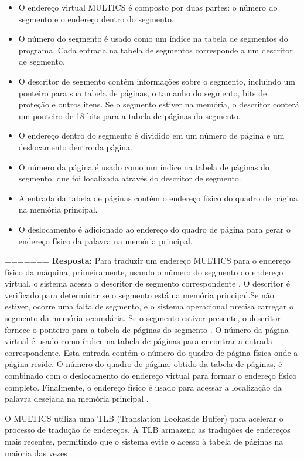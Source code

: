 \documentclass{article}
\begin{document}
\begin{itemize}
  \item O endereço virtual MULTICS é composto por duas partes: o número do segmento e o endereço dentro do segmento.
  \item O número do segmento é usado como um índice na tabela de segmentos do programa. Cada entrada na tabela de segmentos corresponde a um descritor de segmento.
  \item O descritor de segmento contém informações sobre o segmento, incluindo um ponteiro para sua tabela de páginas, o tamanho do segmento, bits de proteção e outros itens. Se o segmento estiver na memória, o descritor conterá um ponteiro de 18 bits para a tabela de páginas do segmento.
  \item O endereço dentro do segmento é dividido em um número de página e um deslocamento dentro da página.
  \item O número da página é usado como um índice na tabela de páginas do segmento, que foi localizada através do descritor de segmento.
  \item A entrada da tabela de páginas contém o endereço físico do quadro de página na memória principal.
  \item O deslocamento é adicionado ao endereço do quadro de página para gerar o endereço físico da palavra na memória principal.
\end{itemize}
=======
\textbf{Resposta:} Para traduzir um endereço MULTICS para o endereço físico da máquina, primeiramente, usando o número do segmento do endereço virtual, o sistema acessa o descritor de segmento correspondente \textcite[p. 169]{tanenbaum2021}. O descritor é verificado para determinar se o segmento está na memória principal.Se não estiver, ocorre uma falta de segmento, e o sistema operacional precisa carregar o segmento da memória secundária. Se o segmento estiver presente, o descritor fornece o ponteiro para a tabela de páginas do segmento \textcite[p. 170]{tanenbaum2021}. O número da página virtual é usado como índice na tabela de páginas para encontrar a entrada correspondente. Esta entrada contém o número do quadro de página física onde a página reside.  O número do quadro de página, obtido da tabela de páginas, é combinado com o deslocamento do endereço virtual para formar o endereço físico completo. Finalmente, o endereço físico é usado para acessar a localização da palavra desejada na memória principal \textcite[p. 171]{tanenbaum2021}.

O MULTICS utiliza uma TLB (Translation Lookaside Buffer) para acelerar o processo de tradução de endereços. A TLB armazena as traduções de endereços mais recentes, permitindo que o sistema evite o acesso à tabela de páginas na maioria das vezes \textcite[p. 172]{tanenbaum2021}.
\end{document}
